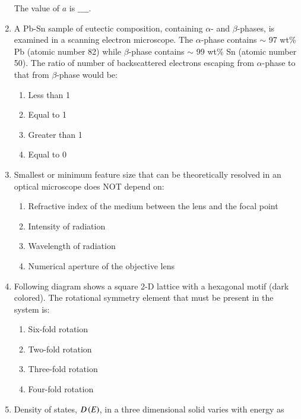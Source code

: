 \documentclass[journal]{IEEEtran}
\begin{document}
\begin{enumerate}
The value of $a$ is $\_\_\_\_$. \\
\begin{figure}[!ht]
\centering
\resizebox{0.7\textwidth}{!}{%

}%
\end{figure}
\item A Pb-Sn sample of eutectic composition, containing $\alpha$- and $\beta$-phases, is examined in a scanning electron microscope. The $\alpha$-phase contains $\sim$ 97 wt\% Pb (atomic number 82) while $\beta$-phase contains $\sim$ 99 wt\% Sn (atomic number 50). The ratio of number of backscattered electrons escaping from $\alpha$-phase to that from $\beta$-phase would be:
\begin{enumerate}
    \item Less than 1
    \item Equal to 1
    \item Greater than 1
    \item Equal to 0 \\
\end{enumerate}
\item Smallest or minimum feature size that can be theoretically resolved in an optical microscope does NOT depend on:
\begin{enumerate}
    \item Refractive index of the medium between the lens and the focal point
    \item Intensity of radiation
    \item Wavelength of radiation
    \item Numerical aperture of the objective lens \\ 
\end{enumerate}
\item Following diagram shows a square 2-D lattice with a hexagonal motif (dark colored). The rotational symmetry element that must be present in the system is:
\begin{figure}[!ht]
\centering
\resizebox{0.3\textwidth}{!}{%

}%
\end{figure}
\begin{enumerate}
    \item Six-fold rotation
    \item Two-fold rotation
    \item Three-fold rotation
    \item Four-fold rotation \\
\end{enumerate}
\item Density of states, $D\left(E\right)$, in a three dimensional solid varies with energy  as

\end{enumerate}
\end{document}
